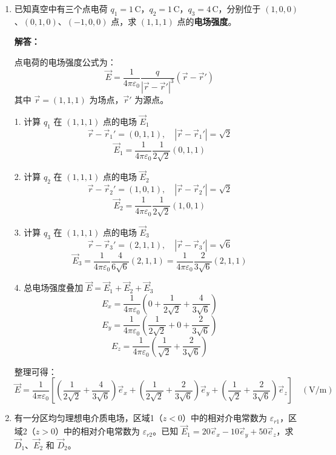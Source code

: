 \begin{enumerate}[label=\arabic*.]
\item 已知真空中有三个点电荷 \(q_1 = 1\,\text{C}\)，\(q_2 = 1\,\text{C}\)，\(q_3 = 4\,\text{C}\)，分别位于 \((1,0,0)\)、\((0,1,0)\)、\((-1,0,0)\) 点，求 \((1,1,1)\) 点的\textbf{电场强度}。

\textbf{解答：}

点电荷的电场强度公式为：
\[
\vec{E} = \frac{1}{4\pi\varepsilon_0} \frac{q}{|\vec{r} - \vec{r}'|^3} (\vec{r} - \vec{r}')
\]
其中 \(\vec{r}=(1,1,1)\) 为场点，\(\vec{r}'\) 为源点。

\vspace{0.5em}
1. 计算 \(q_1\) 在 \((1,1,1)\) 点的电场 \(\vec{E}_1\)
\[
\vec{r} - \vec{r}_1' = (0,1,1),\quad |\vec{r} - \vec{r}_1'| = \sqrt{2}
\]
\[
\vec{E}_1 = \frac{1}{4\pi\varepsilon_0} \frac{1}{2\sqrt{2}} (0,1,1)
\]

\vspace{0.5em}
2. 计算 \(q_2\) 在 \((1,1,1)\) 点的电场 \(\vec{E}_2\)
\[
\vec{r} - \vec{r}_2' = (1,0,1),\quad |\vec{r} - \vec{r}_2'| = \sqrt{2}
\]
\[
\vec{E}_2 = \frac{1}{4\pi\varepsilon_0} \frac{1}{2\sqrt{2}} (1,0,1)
\]

\vspace{0.5em}
3. 计算 \(q_3\) 在 \((1,1,1)\) 点的电场 \(\vec{E}_3\)
\[
\vec{r} - \vec{r}_3' = (2,1,1),\quad |\vec{r} - \vec{r}_3'| = \sqrt{6}
\]
\[
\vec{E}_3 = \frac{1}{4\pi\varepsilon_0} \frac{4}{6\sqrt{6}} (2,1,1) = \frac{1}{4\pi\varepsilon_0} \frac{2}{3\sqrt{6}} (2,1,1)
\]

\vspace{0.5em}
4. 总电场强度叠加 \(\vec{E} = \vec{E}_1 + \vec{E}_2 + \vec{E}_3\)
\[
E_x = \frac{1}{4\pi\varepsilon_0} \left( 0 + \frac{1}{2\sqrt{2}} + \frac{4}{3\sqrt{6}} \right)
\]
\[
E_y = \frac{1}{4\pi\varepsilon_0} \left( \frac{1}{2\sqrt{2}} + 0 + \frac{2}{3\sqrt{6}} \right)
\]
\[
E_z = \frac{1}{4\pi\varepsilon_0} \left( \frac{1}{\sqrt{2}} + \frac{2}{3\sqrt{6}} \right)
\]

整理可得：
\[
\vec{E} = \frac{1}{4\pi\varepsilon_0} \left[
\left( \frac{1}{2\sqrt{2}} + \frac{4}{3\sqrt{6}} \right)\vec{e}_x
+ \left( \frac{1}{2\sqrt{2}} + \frac{2}{3\sqrt{6}} \right)\vec{e}_y
+ \left( \frac{1}{\sqrt{2}} + \frac{2}{3\sqrt{6}} \right)\vec{e}_z
\right] \quad (\text{V/m})
\]

\vspace{1em}

\item 有一分区均匀理想电介质电场，区域1（\(z<0\)）中的相对介电常数为 \(\varepsilon_{r1}\)，区域2（\(z>0\)）中的相对介电常数为 \(\varepsilon_{r2}\)。已知 \(\vec{E}_1 = 20\vec{e}_x - 10\vec{e}_y + 50\vec{e}_z\)，求 \(\vec{D}_1\)、\(\vec{E}_2\) 和 \(\vec{D}_2\)。


\end{enumerate}
